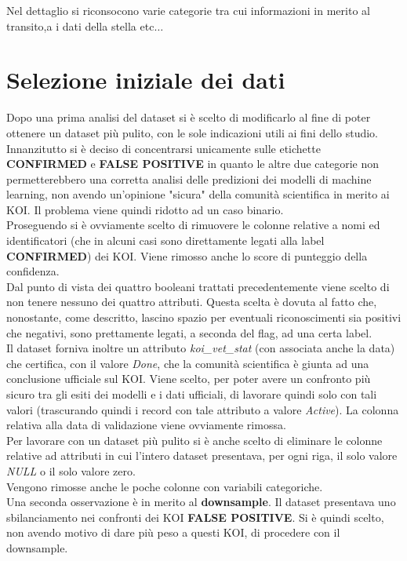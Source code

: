 Nel dettaglio si riconsocono varie categorie tra cui informazioni in merito al 
transito,a i dati della stella etc$\ldots$

\section{Selezione iniziale dei dati}
Dopo una prima analisi del dataset si è scelto di modificarlo al fine di poter 
ottenere un dataset più pulito, con le sole indicazioni utili ai fini dello 
studio.\\
Innanzitutto si è deciso di concentrarsi unicamente sulle etichette 
\textbf{CONFIRMED} e \textbf{FALSE POSITIVE} in quanto le altre due categorie
non permetterebbero una corretta analisi delle predizioni dei modelli di machine
learning, non avendo un'opinione "sicura" della comunità scientifica in merito 
ai KOI. Il problema viene quindi ridotto ad un caso binario.\\
Proseguendo si è ovviamente scelto di rimuovere le colonne relative a nomi ed
identificatori (che in alcuni casi sono direttamente legati alla label 
\textbf{CONFIRMED}) dei KOI. Viene rimosso anche lo score di punteggio della 
confidenza. \\
Dal punto di vista dei quattro booleani trattati precedentemente viene scelto
di non tenere nessuno dei quattro attributi. Questa scelta è dovuta al fatto 
che, nonostante, come descritto, lascino spazio per eventuali riconoscimenti 
sia positivi che negativi, sono prettamente legati, a seconda del flag, ad una
certa label. \\
Il dataset forniva inoltre un attributo \textit{koi\_vet\_stat} (con associata 
anche la data) che certifica, con il valore \textit{Done}, che la comunità 
scientifica è giunta ad una conclusione ufficiale sul KOI. Viene scelto, per
poter avere un confronto più sicuro tra gli esiti dei modelli e i dati 
ufficiali, di lavorare quindi solo con tali valori (trascurando quindi i 
record con tale attributo a valore \textit{Active}). La colonna relativa alla 
data di validazione viene ovviamente rimossa.\\
Per lavorare con un dataset più pulito si è anche scelto di eliminare le colonne
relative ad attributi in cui l'intero dataset presentava, per ogni riga, il solo
valore \textit{NULL} o il solo valore zero.\\
Vengono rimosse anche le poche colonne con variabili categoriche.\\

Una seconda osservazione è in merito al \textbf{downsample}. Il dataset 
presentava uno sbilanciamento nei confronti dei KOI \textbf{FALSE POSITIVE}. Si 
è quindi scelto, non avendo motivo di dare più peso a questi KOI, di procedere 
con il downsample.


